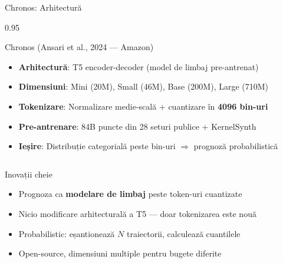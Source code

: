 \documentclass[9pt, aspectratio=169, t]{beamer}
\begin{document}
\begin{frame}{Chronos: Arhitectură}
    \begin{cminipage}{0.95\textwidth}
    \vspace{-3mm}
    {\scriptsize
    \begin{block}{Chronos (Ansari et al., 2024 --- Amazon)}
        \vspace{-1mm}
        \begin{itemize}\setlength{\itemsep}{0pt}
            \item \textbf{Arhitectură}: T5 encoder-decoder (model de limbaj pre-antrenat)
            \item \textbf{Dimensiuni}: Mini (20M), Small (46M), Base (200M), Large (710M)
            \item \textbf{Tokenizare}: Normalizare medie-scală + cuantizare în \textbf{4096 bin-uri}
            \item \textbf{Pre-antrenare}: 84B puncte din 28 seturi publice + KernelSynth
            \item \textbf{Ieșire}: Distribuție categorială peste bin-uri $\Rightarrow$ prognoză probabilistică
        \end{itemize}
        \vspace{-1mm}
    \end{block}
    \vspace{-3mm}
    \begin{columns}[T]
        \begin{exampleblock}{Inovații cheie}
            \begin{itemize}\setlength{\itemsep}{0pt}
                \item Prognoza ca \textbf{modelare de limbaj} peste token-uri cuantizate
                \item Nicio modificare arhitecturală a T5 --- doar tokenizarea este nouă
                \item Probabilistic: eșantionează $N$ traiectorii, calculează cuantilele
                \item Open-source, dimensiuni multiple pentru bugete diferite
            \end{itemize}
        \end{exampleblock}


\end{columns}}
\end{cminipage}
\end{frame}
\end{document}
